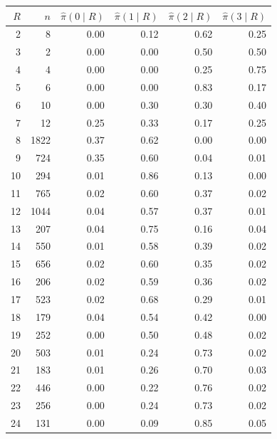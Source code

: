 \begin{tabular}{rrrrrr}
\toprule
$R$ & $n$ & $\hat\pi(0\mid R)$ & $\hat\pi(1\mid R)$ & $\hat\pi(2\mid R)$ & $\hat\pi(3\mid R)$ \\
\midrule
2 & 8 & 0.00 & 0.12 & 0.62 & 0.25 \\
3 & 2 & 0.00 & 0.00 & 0.50 & 0.50 \\
4 & 4 & 0.00 & 0.00 & 0.25 & 0.75 \\
5 & 6 & 0.00 & 0.00 & 0.83 & 0.17 \\
6 & 10 & 0.00 & 0.30 & 0.30 & 0.40 \\
7 & 12 & 0.25 & 0.33 & 0.17 & 0.25 \\
8 & 1822 & 0.37 & 0.62 & 0.00 & 0.00 \\
9 & 724 & 0.35 & 0.60 & 0.04 & 0.01 \\
10 & 294 & 0.01 & 0.86 & 0.13 & 0.00 \\
11 & 765 & 0.02 & 0.60 & 0.37 & 0.02 \\
12 & 1044 & 0.04 & 0.57 & 0.37 & 0.01 \\
13 & 207 & 0.04 & 0.75 & 0.16 & 0.04 \\
14 & 550 & 0.01 & 0.58 & 0.39 & 0.02 \\
15 & 656 & 0.02 & 0.60 & 0.35 & 0.02 \\
16 & 206 & 0.02 & 0.59 & 0.36 & 0.02 \\
17 & 523 & 0.02 & 0.68 & 0.29 & 0.01 \\
18 & 179 & 0.04 & 0.54 & 0.42 & 0.00 \\
19 & 252 & 0.00 & 0.50 & 0.48 & 0.02 \\
20 & 503 & 0.01 & 0.24 & 0.73 & 0.02 \\
21 & 183 & 0.01 & 0.26 & 0.70 & 0.03 \\
22 & 446 & 0.00 & 0.22 & 0.76 & 0.02 \\
23 & 256 & 0.00 & 0.24 & 0.73 & 0.02 \\
24 & 131 & 0.00 & 0.09 & 0.85 & 0.05 \\
\bottomrule
\end{tabular}

